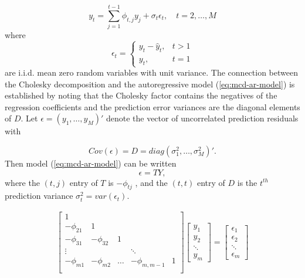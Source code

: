 \begin{equation} \label{eq:mcd-ar-model}
y_t = \sum_{j = 1}^{t-1} \phi_{t,j} y_j + \sigma_t\epsilon_t, \quad t = 2, \dots, M
\end{equation}
\noindent
where 
\begin{equation*}
\epsilon_t = \left\{ \begin{array}{lr} 
y_t  -  \hat{y}_t, & t > 1 \\
y_t, & t = 1\end{array} \right. 
\end{equation*}
\noindent
are i.i.d. mean zero random variables with unit variance.  The connection between the Cholesky decomposition and the autoregressive model (\ref{eq:mcd-ar-model}) is established by noting that the Cholesky factor contains the negatives of the regression coefficients and the prediction error variances are the diagonal elements of $D$.  Let $\epsilon = \left(y_1, \dots, y_M\right)'$ denote the vector of uncorrelated prediction residuals with

\[
Cov\left(\epsilon\right) = D = diag\left(\sigma_1^2,\dots, \sigma_M^2\right)'.
\]
\noindent
Then model (\ref{eq:mcd-ar-model}) can be written 
\begin{equation} \label{eq:e-equals-T-Y}
\epsilon = TY,
\end{equation}
\noindent
where the $\left(t, j\right)$ entry of $T$ is $-\phi_{tj}$ , and the $(t, t)$ entry of $D$ is the $t^{th}$ prediction variance $\sigma_t^2 = var\left(\epsilon_t\right)$. 

\begin{align}
\begin{bmatrix}
1&&&&\\
-\phi_{21}&1&&&\\
-\phi_{31}&-\phi_{32}&1&&\\
\vdots &&&\ddots& \\
-\phi_{m1}&-\phi_{m2}& \dots & -\phi_{m,m-1}&1\\
\end{bmatrix}
\begin{bmatrix}
y_1 \\
y_2 \\ \ddots \\ y_m
\end{bmatrix} = \begin{bmatrix}
\epsilon_1 \\
\epsilon_2 \\ \ddots \\ \epsilon_m
\end{bmatrix}
\end{align}


